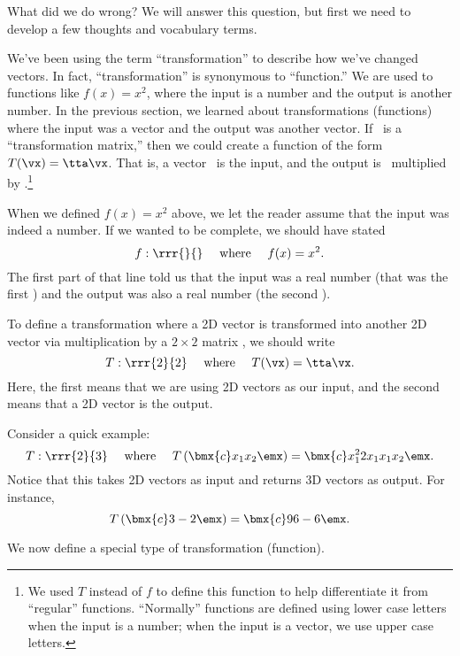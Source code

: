 What did we do wrong? We will answer this question, but first we need to develop a few thoughts and vocabulary terms. 

We've been using the term ``transformation'' to describe how we've changed vectors. In fact, ``transformation'' is synonymous to ``function.'' We are used to functions like $f(x) = x^2$, where the input is a number and the output is another number. In the previous section, we learned about transformations (functions) where the input was a vector and the output was another vector. If \tta\ is a ``transformation matrix,'' then we could create a function of the form $T(\vx) = \tta\vx$. That is, a vector \vx\ is the input, and the output is \vx\ multiplied by \tta.\footnote{We used $T$ instead of $f$ to define this function to help differentiate it from ``regular'' functions. ``Normally'' functions are defined using lower case letters when the input is a number; when the input is a vector, we use upper case letters.} 

When we defined $f(x) = x^2$ above, we let the reader assume that the input was indeed a number. If we wanted to be complete, we should have stated $$f:\rrr{}{} \quad \text{ where } \quad f(x)=x^2.$$
The first part of that line told us that the input was a real number (that was the first \real{}) and the output was also a real number (the second \real{}).

To define a transformation where a 2D vector is transformed into another 2D vector via multiplication by a $2\times 2$ matrix \tta, we should write $$T:\rrr{2}{2} \quad \text{ where } \quad T(\vx) = \tta\vx.$$ Here, the first  means that we are using 2D vectors as our input, and the second  means that a 2D vector is the output.

Consider a quick example: $$T:\rrr{2}{3} \quad \text{ where } \quad T\left(\bmx{c}x_1\\x_2\emx\right) = \bmx{c}x_1^2\\2x_1\\x_1x_2\emx.$$ Notice that this takes 2D vectors as input and returns 3D vectors as output. For instance, $$T\left(\bmx{c}3\\-2\emx\right) = \bmx{c}9\\6\\-6\emx.$$

We now define a special type of transformation (function).


